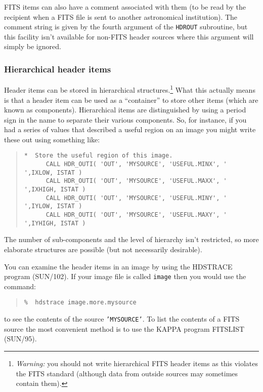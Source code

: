 \documentclass[twoside,11pt]{article}
\newcommand{\xref}[3]{#1}
\renewcommand{\_}{\texttt{\symbol{95}}}
\newcommand{\myverb}[1]{{\texttt{#1}}}
\newenvironment{code}{\begin{small} \begin{quote}}
                     {\end{quote} \end{small}}
\begin{document}
FITS items can also have a comment associated with them (to be read by
the recipient when a FITS file is sent to another astronomical
institution). The comment string is given by the fourth argument of
the \myverb{HDR\_OUT} subroutine, but this facility isn't available
for non-FITS header sources where this argument will simply be
ignored.


\subsubsection{Hierarchical header items}

Header items can be stored in hierarchical structures.\footnote{ {\em
Warning:} you should not write hierarchical FITS header items as this
violates the FITS standard (although data from outside sources may
sometimes contain them).}  What this actually means is that a header
item can be used as a ``container'' to store other items (which are
known as components). Hierarchical items are distinguished by using a
period sign in the name to separate their various components. So, for
instance, if you had a series of values that described a useful region
on an image you might write these out using something like:
\begin{code}
\begin{verbatim}
*  Store the useful region of this image.
      CALL HDR_OUTI( 'OUT', 'MYSOURCE', 'USEFUL.MINX', ' ',IXLOW, ISTAT )
      CALL HDR_OUTI( 'OUT', 'MYSOURCE', 'USEFUL.MAXX', ' ',IXHIGH, ISTAT )
      CALL HDR_OUTI( 'OUT', 'MYSOURCE', 'USEFUL.MINY', ' ',IYLOW, ISTAT )
      CALL HDR_OUTI( 'OUT', 'MYSOURCE', 'USEFUL.MAXY', ' ',IYHIGH, ISTAT )
\end{verbatim}
\end{code}
The number of sub-components and the level of hierarchy isn't
restricted, so more elaborate structures are possible (but not
necessarily desirable).

You can examine the header items in an image by using the HDSTRACE program
(\xref{SUN/102}{sun102}{}). If your image file is called
\myverb{image} then you would use the command:
\begin{code}
\begin{verbatim}
%  hdstrace image.more.mysource
\end{verbatim}
\end{code}
to see the contents of the source \myverb{'MYSOURCE'}. To list the
contents of a FITS source the most convenient method is to use the
KAPPA program \xref{FITSLIST}{sun95}{FITSLIST}
(\xref{SUN/95}{sun95}{}).
\end{document}
